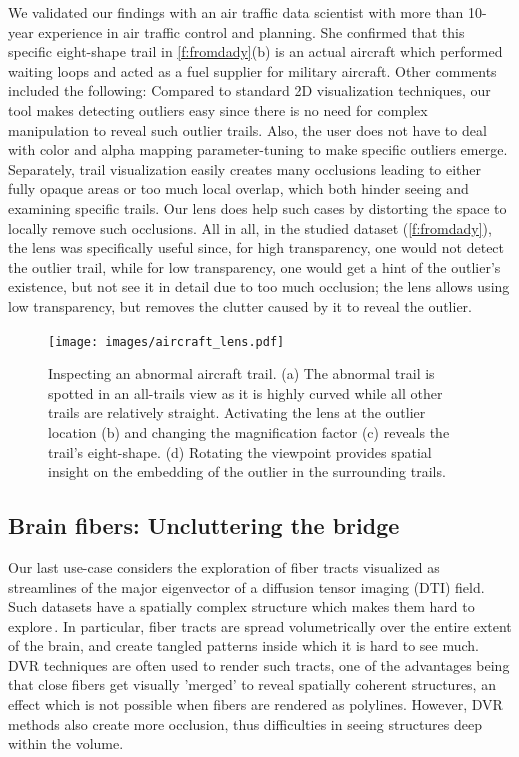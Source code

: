 We validated our findings with an air traffic data scientist with more than 10-year experience in air traffic control and planning. She confirmed that this specific eight-shape trail in \autoref{f:fromdady}(b) is an actual aircraft which performed waiting loops and acted as a fuel supplier for military aircraft. Other comments included the following: Compared to standard 2D visualization techniques, our tool makes detecting outliers easy since there is no need for complex manipulation to reveal such outlier trails. Also, the user does not have to deal with color and alpha mapping parameter-tuning to make specific outliers emerge. Separately, trail visualization easily creates many occlusions leading to either fully opaque areas or too much local overlap, which both hinder seeing and examining specific trails. Our lens does help such cases by distorting the space to locally remove such occlusions. All in all, in the studied dataset (\autoref{f:fromdady}), the lens was specifically useful since, for high transparency, one would not detect the outlier trail, while for low transparency, one would get a hint of the outlier's existence, but not see it in detail due to too much occlusion; the lens allows using low transparency, but removes the clutter caused by it to reveal the outlier.


\begin{figure}
\centering
\texttt{[image: images/aircraft\_lens.pdf]}
\caption{Inspecting an abnormal aircraft trail. (a) The abnormal trail is spotted in an all-trails view as it is highly curved while all other trails are relatively straight. Activating the lens at the outlier location (b) and changing the magnification factor (c) reveals the trail's eight-shape. (d) Rotating the viewpoint provides spatial insight on the embedding of the outlier in the surrounding trails.}
\label{f:aircraft_lens}
\end{figure}
%

\subsection{Brain fibers: Uncluttering the bridge}
\label{sec:dti}
%
Our last use-case considers the exploration of fiber tracts visualized as streamlines of the major eigenvector of a diffusion tensor imaging (DTI) field. Such datasets have a spatially complex structure which makes them hard to explore\,\cite{assaf08}. In particular, fiber tracts are spread volumetrically over the entire extent of the brain, and create tangled patterns inside which it is hard to see much. DVR techniques are often used to render such tracts, one of the advantages being that close fibers get visually 'merged' to reveal spatially coherent structures, an effect which is not possible when fibers are rendered as polylines. However, DVR methods also create more occlusion, thus difficulties in seeing structures deep within the volume.

